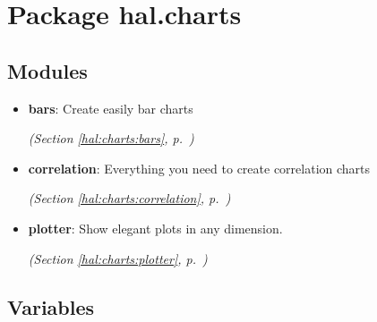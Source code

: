 %
%
%


\section{Package hal.charts}

    \label{hal:charts}


\subsection{Modules}

\begin{itemize}
\setlength{\parskip}{0ex}
\item \textbf{bars}: Create easily bar charts 


  \textit{(Section \ref{hal:charts:bars}, p.~\pageref{hal:charts:bars})}

\item \textbf{correlation}: Everything you need to create correlation charts 


  \textit{(Section \ref{hal:charts:correlation}, p.~\pageref{hal:charts:correlation})}

\item \textbf{plotter}: Show elegant plots in any dimension. 


  \textit{(Section \ref{hal:charts:plotter}, p.~\pageref{hal:charts:plotter})}

\end{itemize}



  \subsection{Variables}

